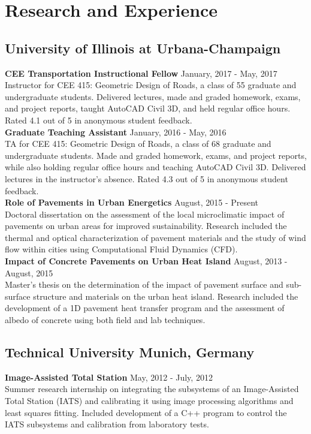\documentclass[12pt]{article}
\begin{document}
\section*{Research and Experience}
\subsection*{University of Illinois at Urbana-Champaign}
\textbf{CEE Transportation Instructional Fellow} \hfill January, 2017 - May, 2017 \\
Instructor for CEE 415: Geometric Design of Roads, a class of 55 graduate and undergraduate students. Delivered lectures, made and graded homework, exams, and project reports, taught AutoCAD Civil 3D, and held regular office hours. Rated 4.1 out of 5 in anonymous student feedback. \\

\textbf{Graduate Teaching Assistant} \hfill January, 2016 - May, 2016 \\
TA for CEE 415: Geometric Design of Roads, a class of 68 graduate and undergraduate students. Made and graded homework, exams, and project reports, while also holding regular office hours and teaching AutoCAD Civil 3D. Delivered lectures in the instructor’s absence. Rated 4.3 out of 5 in anonymous student feedback. \\

\textbf{Role of Pavements in Urban Energetics} \hfill August, 2015 - Present \\
Doctoral dissertation on the assessment of the local microclimatic impact of pavements on urban areas for improved sustainability. Research included the thermal and optical characterization of pavement materials and the study of wind flow within cities using Computational Fluid Dynamics (CFD). \\

\textbf{Impact of Concrete Pavements on Urban Heat Island} \hfill August, 2013 - August, 2015 \\
Master's thesis on the determination of the impact of pavement surface and sub-surface structure and materials on the urban heat island. Research included the development of a 1D pavement heat transfer program and the assessment of albedo of concrete using both field and lab techniques.\\

\subsection*{Technical University Munich, Germany}
\textbf{Image-Assisted Total Station} \hfill May, 2012 - July, 2012 \\
Summer research internship on integrating the subsystems of an Image-Assisted Total Station (IATS) and calibrating it using image processing algorithms and least squares fitting. Included development of a C++ program to control the IATS subsystems and calibration from laboratory tests.\\
\end{document}
